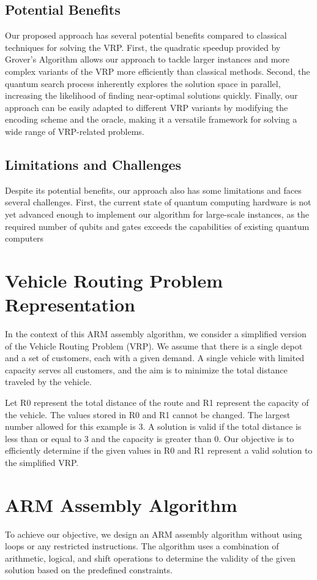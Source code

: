 \subsection{Potential Benefits}

Our proposed approach has several potential benefits compared to classical techniques for solving the VRP. First, the quadratic speedup provided by Grover's Algorithm allows our approach to tackle larger instances and more complex variants of the VRP more efficiently than classical methods. Second, the quantum search process inherently explores the solution space in parallel, increasing the likelihood of finding near-optimal solutions quickly. Finally, our approach can be easily adapted to different VRP variants by modifying the encoding scheme and the oracle, making it a versatile framework for solving a wide range of VRP-related problems.

\subsection{Limitations and Challenges}

Despite its potential benefits, our approach also has some limitations and faces several challenges. First, the current state of quantum computing hardware is not yet advanced enough to implement our algorithm for large-scale instances, as the required number of qubits and gates exceeds the capabilities of existing quantum computers

\section{Vehicle Routing Problem Representation}
In the context of this ARM assembly algorithm, we consider a simplified version of the Vehicle Routing Problem (VRP). We assume that there is a single depot and a set of customers, each with a given demand. A single vehicle with limited capacity serves all customers, and the aim is to minimize the total distance traveled by the vehicle.

Let R0 represent the total distance of the route and R1 represent the capacity of the vehicle. The values stored in R0 and R1 cannot be changed. The largest number allowed for this example is 3. A solution is valid if the total distance is less than or equal to 3 and the capacity is greater than 0. Our objective is to efficiently determine if the given values in R0 and R1 represent a valid solution to the simplified VRP.

\section{ARM Assembly Algorithm}
To achieve our objective, we design an ARM assembly algorithm without using loops or any restricted instructions. The algorithm uses a combination of arithmetic, logical, and shift operations to determine the validity of the given solution based on the predefined constraints.

